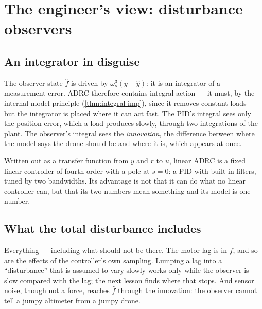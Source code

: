 \section{The engineer's view: disturbance observers}

\subsection{An integrator in disguise}
The observer state $\hat f$ is driven by $\omega_o^3(y - \hat y)$: it is an integrator of a measurement error. ADRC therefore contains integral action — it must, by the internal model principle (\cref{thm:integral-imp}), since it removes constant loads — but the integrator is placed where it can act fast. The PID's integral sees only the position error, which a load produces slowly, through two integrations of the plant. The observer's integral sees the \emph{innovation}, the difference between where the model says the drone should be and where it is, which appears at once.

Written out as a transfer function from $y$ and $r$ to $u$, linear ADRC is a fixed linear controller of fourth order with a pole at $s = 0$: a PID with built-in filters, tuned by two bandwidths. Its advantage is not that it can do what no linear controller can, but that its two numbers mean something and its model is one number.

\subsection{What the total disturbance includes}
Everything — including what should not be there. The motor lag is in $f$, and so are the effects of the controller's own sampling. Lumping a lag into a \enquote{disturbance} that is assumed to vary slowly works only while the observer is slow compared with the lag; the next lesson finds where that stops. And sensor noise, though not a force, reaches $\hat f$ through the innovation: the observer cannot tell a jumpy altimeter from a jumpy drone.

